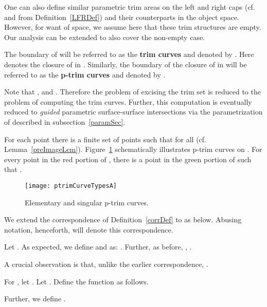 \documentclass{elsart5p}
\newcommand{\eat}[1]{}
\begin{document}
One can also define similar parametric trim areas on the left and right
caps (cf.  and  from Definition~\ref{LFRDef}) and their counterparts in the object
space. However, for want of space, we assume here that these trim structures are empty. Our analysis can
be extended to also cover the non-empty case.


\begin{defn} \label{trimCurveDef}
The boundary of  will be referred to as the {\bf trim curves} and denoted by . Here  denotes the closure of 
 in . Similarly,
the boundary of the closure  of  in  
will be referred to as the {\bf p-trim curves} and denoted by .
\end{defn}

Note that ,
 and 
.
Therefore the problem of excising the trim set is 
reduced to the problem of computing the trim curves. Further, 
this computation is eventually reduced to {\em guided} parametric 
surface-surface intersections via the parametrization of  
described in subsection~\ref{paramSec}.

For each point  there is a finite set of points  such that  
for all  (cf. Lemma~\ref{preImageLem}). 
Figure~\ref{ptrimCurveAFig} schematically illustrates p-trim curves on .  For every 
point  in the red portion of , there is a point  in the green portion of  
such that .


\begin{figure}
 \centering
 \texttt{[image: ptrimCurveTypesA]}
 \caption{Elementary and singular p-trim curves.}
 \label{ptrimCurveAFig}
\end{figure}

We extend the correspondence of Definition~\ref{corrDef} 
to  as below. Abusing notation, henceforth,  will denote this correspondence. 
\eat{
We extend the correspondence defined in Definition~\ref{corrDef} to . By abuse of notation, we denote this extended relation again by 
 and the following definition of  will be used in  the rest of the paper.
}
\begin{defn} 
Let 
.
As expected, we define  
and  as:
.
Further, as before,
,\!
.
\end{defn}

A crucial observation is that, unlike the earlier correspondence, {\em }.

\begin{defn} \label{lDef}
For , let . Let . Define the function 
 as follows.

Further, we define .
\end{defn}
\end{document}
